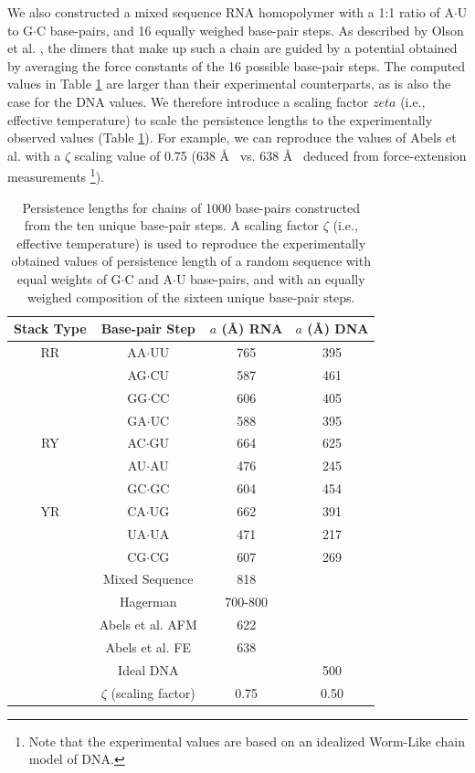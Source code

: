 We also constructed a mixed  sequence RNA homopolymer with a 1:1 ratio
of A$\cdot$U to G$\cdot$C base-pairs, and 16 equally weighed base-pair
steps. As described by Olson et al. \cite{olson2009c}, the dimers that
make up such  a chain are guided by a  potential obtained by averaging
the force constants  of the 16 possible base-pair  steps. The computed
values in  Table \ref{tab:compare} are larger  than their experimental
counterparts, as  is also the case  for the DNA  values.  We therefore
introduce  a scaling  factor $zeta$  (i.e., effective  temperature) to
scale the  persistence lengths  to the experimentally  observed values
(Table \ref{tab:compare}).   For example, we can  reproduce the values
of Abels et  al.\cite{abels2005} with a $\zeta$ scaling  value of 0.75
(638 \AA~ vs.  638 \AA~ deduced from force-extension
measurements \footnote{Note that the  experimental values are based on
  an idealized Worm-Like chain model of DNA.}).

\begin{table}[ht]  
\begin{center}
\begin{tabular}{|c|c|c|c|}
\hline
Stack Type & Base-pair Step & $a$ (\AA) RNA & $a$ (\AA) DNA\\
\hline \hline
RR &  AA$\cdot$UU & 765      &  395   \\
   &  AG$\cdot$CU & 587      &  461   \\
   &  GG$\cdot$CC & 606      &  405   \\
   &  GA$\cdot$UC & 588      &  395   \\
\hline
RY &  AC$\cdot$GU & 664      &  625   \\
   &  AU$\cdot$AU & 476      &  245   \\
   &  GC$\cdot$GC & 604      &  454   \\
\hline
YR &  CA$\cdot$UG & 662      &  391   \\
   &  UA$\cdot$UA & 471      &  217   \\
   &  CG$\cdot$CG & 607      &  269   \\
\hline
   & Mixed Sequence  & 818   &        \\
   & Hagerman   & 700-800    &        \\
   & Abels et al. AFM  & 622    &        \\ 
   & Abels et al. FE  & 638    &        \\
   & Ideal DNA    &          & 500    \\
   & $\zeta$ (scaling factor)  & 0.75 & 0.50 \\
\hline
\end{tabular}
\caption{Persistence lengths for chains of 1000 base-pairs constructed
  from the ten unique base-pair steps. A scaling factor $\zeta$ (i.e.,
  effective temperature) is used to
  reproduce the experimentally obtained values of persistence length
  of a random sequence with equal weights of G$\cdot$C and A$\cdot$U
  base-pairs, and with an equally weighed composition of the sixteen
  unique base-pair steps.}
\label{tab:compare}
\end{center}
\end{table}

